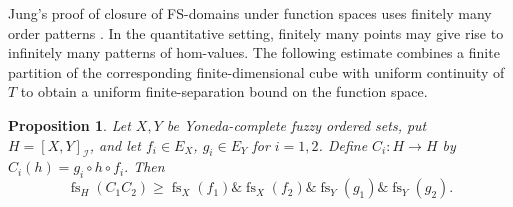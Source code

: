 \documentclass[preprint,3p,times]{elsarticle}
\newtheorem{proposition}[proposition]{Proposition}
\theoremstyle{definition}
\theoremstyle{remark}
\newcommand{\I}{\mathcal{I}}
\newcommand{\fs}{\operatorname{fs}}
\newcommand{\tn}{\mathbin{\&}}
\numberwithin{equation}{section}
\begin{document}
Jung's proof of closure of FS-domains under function spaces uses finitely many order patterns \cite[Theorem~3]{Jung1990}. In the quantitative setting, finitely many points may give rise to infinitely many patterns of hom-values. The following estimate combines a finite partition of the corresponding finite-dimensional cube with uniform continuity of \(T\) to obtain a uniform finite-separation bound on the function space.

\begin{proposition}\label{prop:real-function-fs}
Let \(X,Y\) be Yoneda-complete fuzzy ordered sets, put \(H=[X,Y]_{\I}\), and let \(f_i\in E_X\), \(g_i\in E_Y\) for \(i=1,2\). Define \(C_i\colon H\to H\) by
\(
 C_i(h)=g_i\circ h\circ f_i.
\)
Then
\begin{equation}\label{eq:real-function-fs}
 \fs_H(C_1C_2)\geq
 \fs_X(f_1)\tn\fs_X(f_2)\tn\fs_Y(g_1)\tn\fs_Y(g_2).
\end{equation}
\end{proposition}
\end{document}
